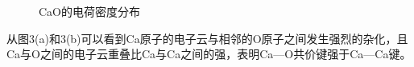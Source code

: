 \documentclass[12pt,a4paper]{article}%
\begin{document}
	\begin{figure}[H]
		\centering    
		
		\caption{CaO的电荷密度分布} %
	\end{figure}
	从图3(a)和3(b)可以看到Ca原子的电子云与相邻的O原子之间发生强烈的杂化，且Ca与O之间的电子云重叠比Ca与Ca之间的强，表明Ca—O共价键强于Ca—Ca键。
\end{document}
